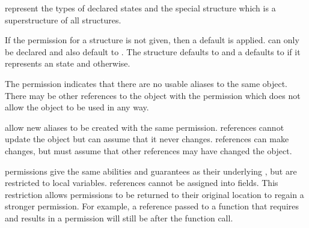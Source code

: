  represent the types of declared states
and the special  structure which is a superstructure
of all structures.

If the permission for a structure is not given, then a default is applied.
 can only be declared 
and also default to .  The  structure 
defaults to  and a  defaults 
to  if it represents an  state 
and  otherwise. 

The  permission indicates that there are no
usable aliases to the same object.  There may be other
references to the object with the  permission
which does not allow the object to be used in any way.

 allow new aliases to be 
created with the same permission.
 references cannot update the object
but can assume that it never changes.  references
can make changes, but must assume that other
references may have changed the object.

 permissions give the same abilities
and guarantees as their underlying , 
but are restricted to local variables.  
 references cannot be assigned into fields.
This restriction allows  permissions to be
returned to their original location to regain a stronger permission.
For example, a  reference passed to a function
that requires and results in a  permission will
still be  after the function call.

